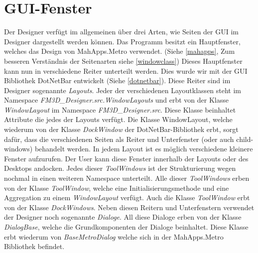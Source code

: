 \section{GUI-Fenster}
\label{guifenster0}

Der Designer verfügt im allgemeinen über drei Arten, wie Seiten der GUI im Designer dargestellt werden können. Das Programm besitzt ein Hauptfenster, welches das Design von MahApps.Metro verwendet. (Siehe \cref{mahapps}, Zum besseren Verständnis der Seitenarten siehe \cref{windowclass})
Dieses Hauptfenster kann nun in verschiedene Reiter unterteilt werden. Dies wurde wir mit der GUI Bibliothek DotNetBar entwickelt (Siehe \cref{dotnetbar}).
Diese Reiter sind im Designer sogenannte \textit{Layouts}. Jeder der verschiedenen Layoutklassen steht im Namespace \textit{FM3D\_Designer.src.WindowLayouts} und erbt von der Klasse \textit{WindowLayout} im Namespace \textit{FM3D\_Designer.src}. Diese Klasse beinhaltet Attribute die jedes der Layouts verfügt.
Die Klasse WindowLayout, welche wiederum von der Klasse \textit{DockWindow} der DotNetBar-Bibliothek erbt, sorgt dafür, dass die verschiedenen Seiten als Reiter und Unterfenster (oder auch child-windows) behandelt werden.
In jedem Layout ist es möglich verschiedene  kleinere Fenster aufzurufen. Der User kann diese Fenster innerhalb der Layouts oder des Desktops andocken. Jedes dieser \textit{ToolWindows} ist der Strukturierung wegen nochmal in einen weiteren Namespace unterteilt. Alle dieser \textit{ToolWindows} erben von der Klasse \textit{ToolWindow}, welche eine Initialisierungsmethode und eine Aggregation zu einem \textit{WindowLayout} verfügt.
Auch die Klasse \textit{ToolWindow} erbt von der Klasse \textit{DockWindows}.
Neben diesen Reitern und Unterfenstern verwendet der Designer noch sogenannte \textit{Dialoge}. All diese Dialoge erben von der Klasse \textit{DialogBase}, welche die Grundkomponenten der Dialoge beinhaltet. Diese Klasse erbt wiederum von \textit{BaseMetroDialog} welche sich in der MahApps.Metro Bibliothek befindet. 

